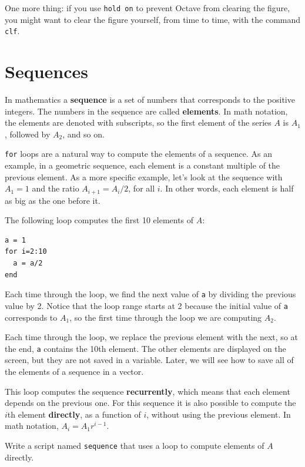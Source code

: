 \documentclass{book}
\begin{document}
One more thing: if you use {\tt hold on} to prevent Octave from
clearing the figure, you might want to clear the figure yourself,
from time to time, with the command {\tt clf}.


\section{Sequences}

In mathematics a {\bf sequence} is a set of numbers that corresponds
to the positive integers. The numbers in the sequence are
called {\bf elements}. In math notation, the elements
are denoted with subscripts, so the first element of the series $A$ is
$A_1$, followed by $A_2$, and so on.

{\tt for} loops are a natural way to compute the elements of a sequence.
As an example, in a geometric sequence, each element is a constant
multiple of the previous element. As a more specific example, let's
look at the sequence with $A_1 = 1$ and the ratio $A_{i+1} = A_i/2$,
for all $i$. In other words, each element is half as big as the one
before it.

The following loop computes the first 10 elements of $A$:

\begin{verbatim}
a = 1
for i=2:10
  a = a/2
end
\end{verbatim}

Each time through the loop, we find the next value of {\tt a}
by dividing the previous value by 2. Notice that the loop
range starts at 2 because the initial value of {\tt a} corresponds
to $A_1$, so the first time through the loop we are computing
$A_2$.

Each time through the loop, we replace the previous element with
the next, so at the end, {\tt a} contains the 10th element. The
other elements are displayed on the screen, but they are not saved
in a variable. Later, we will see how to save all of the elements
of a sequence in a vector.

This loop computes the sequence {\bf recurrently}, which means
that each element depends on the previous one.
For this sequence it is also possible to compute the $i$th element
{\bf directly}, as a function of $i$, without using the previous element.
In math notation, $A_i = A_1 r^{i-1}$. 

\begin{ex}
Write a
script named {\tt sequence} that uses a loop
to compute elements of $A$ directly.
\end{ex}
\end{document}
